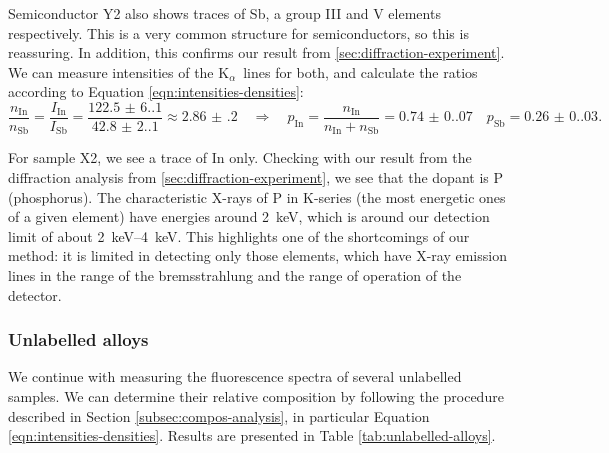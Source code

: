 \documentclass[11pt,a4paper,twoside,onecolumn]{article}
\newcommand{\Kalpha}{$\mathrm{K}_\alpha$~}
\begin{document}
Semiconductor Y2 also shows traces of Sb, a group III and V elements respectively. This is a very common structure for semiconductors, so this is reassuring. In addition, this confirms our result from \ref{sec:diffraction-experiment}. We can measure intensities of the \Kalpha lines for both, and calculate the ratios according to Equation \eqref{eqn:intensities-densities}:
\begin{equation}
    \frac{n_\mathrm{In}}{n_\mathrm{Sb}} = \frac{I_\mathrm{In}}{I_\mathrm{Sb}} = \frac{\num{122.5(6.1)}}{\num{42.8(2.1)}} \approx \num{2.86(20)} \quad \Rightarrow \quad p_\mathrm{In} = \frac{n_\mathrm{In}}{n_\mathrm{In}+n_\mathrm{Sb}} = \num{0.74(0.07)} \quad p_\mathrm{Sb} = \num{0.26(0.03)}.
\end{equation}

For sample X2, we see a trace of In only. Checking with our result from the diffraction analysis from \ref{sec:diffraction-experiment}, we see that the dopant is P (phosphorus). The characteristic X-rays of P in K-series (the most energetic ones of a given element) have energies around \qty{2}{keV}, which is around our detection limit of about \qtyrange{2}{4}{keV}. This highlights one of the shortcomings of our method: it is limited in detecting only those elements, which have X-ray emission lines in the range of the bremsstrahlung and the range of operation of the detector.

\subsubsection{Unlabelled alloys}\label{subsubsec:unlabelled-alloys}
We continue with measuring the fluorescence spectra of several unlabelled samples. We can determine their relative composition by following the procedure described in Section \ref{subsec:compos-analysis}, in particular Equation \eqref{eqn:intensities-densities}. Results are presented in Table \ref{tab:unlabelled-alloys}.
\end{document}
